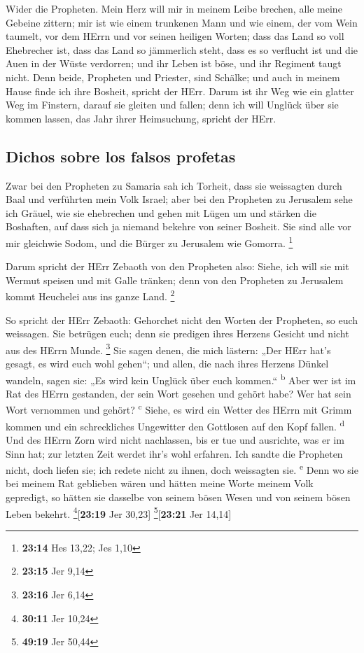  Wider die Propheten. Mein Herz will mir in meinem Leibe
brechen, alle meine Gebeine zittern; mir ist wie einem trunkenen Mann
und wie einem, der vom Wein taumelt, vor dem HErrn und vor seinen
heiligen Worten;  dass das Land so voll Ehebrecher ist,
dass das Land so jämmerlich steht, dass es so verflucht ist und die Auen
in der Wüste verdorren; und ihr Leben ist böse, und ihr Regiment taugt
nicht.  Denn beide, Propheten und Priester, sind Schälke;
und auch in meinem Hause finde ich ihre Bosheit, spricht der HErr.
 Darum ist ihr Weg wie ein glatter Weg im Finstern,
darauf sie gleiten und fallen; denn ich will Unglück über sie kommen
lassen, das Jahr ihrer Heimsuchung, spricht der HErr.

\hypertarget{dichos-sobre-los-falsos-profetas}{%
\subsection{Dichos sobre los falsos
profetas}\label{dichos-sobre-los-falsos-profetas}}

 Zwar bei den Propheten zu Samaria sah ich Torheit, dass
sie weissagten durch Baal und verführten mein Volk Israel;
 aber bei den Propheten zu Jerusalem sehe ich Gräuel, wie
sie ehebrechen und gehen mit Lügen um und stärken die Boshaften, auf
dass sich ja niemand bekehre von seiner Bosheit. Sie sind alle vor mir
gleichwie Sodom, und die Bürger zu Jerusalem wie Gomorra. \footnote{\textbf{23:14}
  Hes 13,22; Jes 1,10}

 Darum spricht der HErr Zebaoth von den Propheten also:
Siehe, ich will sie mit Wermut speisen und mit Galle tränken; denn von
den Propheten zu Jerusalem kommt Heuchelei aus ins ganze Land.
\footnote{\textbf{23:15} Jer 9,14}

 So spricht der HErr Zebaoth: Gehorchet nicht den Worten
der Propheten, so euch weissagen. Sie betrügen euch; denn sie predigen
ihres Herzens Gesicht und nicht aus des HErrn Munde. \footnote{\textbf{23:16}
  Jer 6,14}  Sie sagen denen, die mich lästern: „Der HErr
hat's gesagt, es wird euch wohl gehen``; und allen, die nach ihres
Herzens Dünkel wandeln, sagen sie: „Es wird kein Unglück über euch
kommen.`` \textsuperscript{b}  Aber wer ist im Rat des
HErrn gestanden, der sein Wort gesehen und gehört habe? Wer hat sein
Wort vernommen und gehört? \textsuperscript{c}  Siehe, es
wird ein Wetter des HErrn mit Grimm kommen und ein schreckliches
Ungewitter den Gottlosen auf den Kopf fallen. \textsuperscript{d}
 Und des HErrn Zorn wird nicht nachlassen, bis er tue und
ausrichte, was er im Sinn hat; zur letzten Zeit werdet ihr's wohl
erfahren.  Ich sandte die Propheten nicht, doch liefen
sie; ich redete nicht zu ihnen, doch weissagten sie. \textsuperscript{e}
 Denn wo sie bei meinem Rat geblieben wären und hätten
meine Worte meinem Volk gepredigt, so hätten sie dasselbe von seinem
bösen Wesen und von seinem bösen Leben bekehrt.
\footnote{\textbf{30:11} Jer 10,24}{[}\textbf{23:19} Jer 30,23{]}
\footnote{\textbf{49:19} Jer 50,44}{[}\textbf{23:21} Jer 14,14{]}

